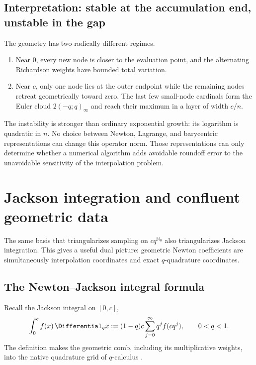 \documentclass[11pt,oneside]{book}
\numberwithin{equation}{chapter}
\theoremstyle{definition}
\theoremstyle{remark}
\newcommand{\Nzero}{\mathbb N_0}
\begin{document}
\section{Interpretation: stable at the accumulation end, unstable in the gap}

The geometry has two radically different regimes.

\begin{enumerate}
\item Near $0$, every new node is closer to the evaluation point, and the
      alternating Richardson weights have bounded total variation.
\item Near $c$, only one node lies at the outer endpoint while the remaining
      nodes retreat geometrically toward zero.  The last few small-node
      cardinals form the Euler cloud $2(-q;q)_\infty$ and reach their maximum
      in a layer of width $c/n$.
\end{enumerate}

The instability is stronger than ordinary exponential growth: its logarithm
is quadratic in $n$.  No choice between Newton, Lagrange, and barycentric
representations can change this operator norm.  Those representations can
only determine whether a numerical algorithm adds avoidable roundoff error
to the unavoidable sensitivity of the interpolation problem.

\chapter{Jackson integration and confluent geometric data}
\label{chap:jackson-hermite}

The same basis that triangularizes sampling on $cq^{\Nzero}$ also
triangularizes Jackson integration.  This gives a useful dual picture:
geometric Newton coefficients are simultaneously interpolation coordinates
and exact $q$-quadrature coordinates.

\section{The Newton--Jackson integral formula}

Recall the Jackson integral on $[0,c]$,
\begin{equation}
 \int_0^c f(x)\,\Differential_qx
 :=(1-q)c\sum_{j=0}^{\infty}q^j f(cq^j),
 \qquad 0<q<1.
 \label{eq:jackson-definition}
\end{equation}
The definition makes the geometric comb, including its multiplicative
weights, into the native quadrature grid of $q$-calculus
\cite{KacCheung2002,DLMF17}.
\end{document}
